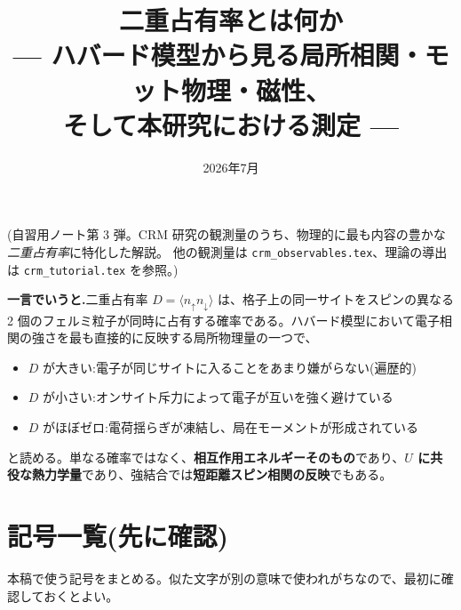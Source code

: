\documentclass[11pt,a4paper]{ltjsarticle}
\title{\bfseries 二重占有率とは何か\\[3pt]
\large — ハバード模型から見る局所相関・モット物理・磁性、\\そして本研究における測定 —}
\author{}
\date{2026年7月}
\newcommand{\ev}[1]{\langle #1\rangle}
\newcommand{\up}{\uparrow}
\newcommand{\dn}{\downarrow}
\begin{document}
\maketitle
\vspace{-1.8em}
\begin{center}\small
(自習用ノート第 3 弾。CRM 研究の観測量のうち、物理的に最も内容の豊かな\emph{二重占有率}に特化した解説。
他の観測量は \texttt{crm\_observables.tex}、理論の導出は \texttt{crm\_tutorial.tex} を参照。)
\end{center}

\tableofcontents

\begin{keybox}
\textbf{一言でいうと.}二重占有率 $D=\ev{n_\up n_\dn}$ は、格子上の同一サイトをスピンの異なる 2 個のフェルミ粒子が同時に占有する確率である。ハバード模型において電子相関の強さを最も直接的に反映する局所物理量の一つで、
\begin{itemize}\itemsep2pt
  \item $D$ が大きい:電子が同じサイトに入ることをあまり嫌がらない(遍歴的)
  \item $D$ が小さい:オンサイト斥力によって電子が互いを強く避けている
  \item $D$ がほぼゼロ:電荷揺らぎが凍結し、局在モーメントが形成されている
\end{itemize}
と読める。単なる確率ではなく、\textbf{相互作用エネルギーそのもの}であり、\textbf{$U$ に共役な熱力学量}であり、強結合では\textbf{短距離スピン相関の反映}でもある。
\end{keybox}

\section*{記号一覧(先に確認)}

本稿で使う記号をまとめる。似た文字が別の意味で使われがちなので、最初に確認しておくとよい。
\end{document}

